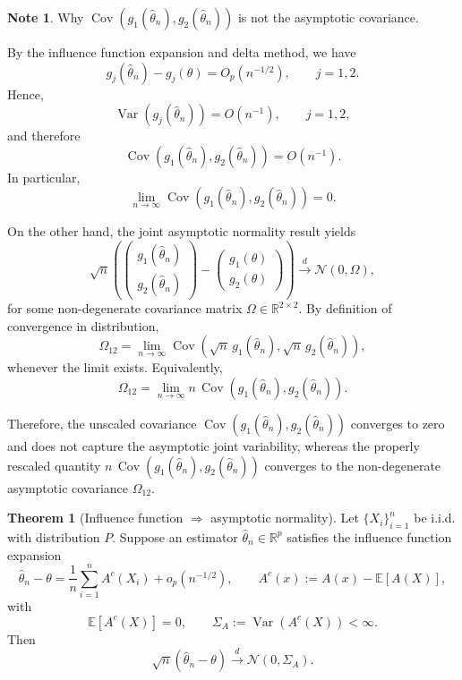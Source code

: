 \documentclass[11pt]{article}
\theoremstyle{definition}
\newtheorem{note}{Note}[section]
\newtheorem{theo}{Theorem}[section]
\begin{document}
\begin{note}
Why $\operatorname{Cov}(g_1(\hat\theta_n), g_2(\hat\theta_n))$ is not the asymptotic covariance.

By the influence function expansion and delta method, we have
\[
g_j(\hat\theta_n) - g_j(\theta)
=
O_p(n^{-1/2}),
\qquad j = 1,2.
\]
Hence,
\[
\operatorname{Var}\!\left(g_j(\hat\theta_n)\right)
=
O(n^{-1}),
\qquad j = 1,2,
\]
and therefore
\[
\operatorname{Cov}\!\left(g_1(\hat\theta_n), g_2(\hat\theta_n)\right)
=
O(n^{-1}).
\]
In particular,
\[
\lim_{n \to \infty}
\operatorname{Cov}\!\left(g_1(\hat\theta_n), g_2(\hat\theta_n)\right)
= 0.
\]

On the other hand, the joint asymptotic normality result yields
\[
\sqrt{n}
\left(
\begin{pmatrix}
g_1(\hat\theta_n) \\
g_2(\hat\theta_n)
\end{pmatrix}
-
\begin{pmatrix}
g_1(\theta) \\
g_2(\theta)
\end{pmatrix}
\right)
\xrightarrow{d}
\mathcal{N}(0, \Omega),
\]
for some non-degenerate covariance matrix $\Omega \in \mathbb{R}^{2 \times 2}$.
By definition of convergence in distribution,
\[
\Omega_{12}
=
\lim_{n \to \infty}
\operatorname{Cov}
\!\left(
\sqrt{n}\, g_1(\hat\theta_n),
\sqrt{n}\, g_2(\hat\theta_n)
\right),
\]
whenever the limit exists. Equivalently,
\[
\Omega_{12}
=
\lim_{n \to \infty}
n \, \operatorname{Cov}
\!\left(
g_1(\hat\theta_n),
g_2(\hat\theta_n)
\right).
\]

Therefore, the unscaled covariance $\operatorname{Cov}(g_1(\hat\theta_n), g_2(\hat\theta_n))$ converges to zero and does not capture the asymptotic joint variability, whereas the properly rescaled quantity $n \, \operatorname{Cov}(g_1(\hat\theta_n), g_2(\hat\theta_n))$ converges to the non-degenerate asymptotic covariance $\Omega_{12}$.
\end{note}

\begin{theo}[Influence function $\Rightarrow$ asymptotic normality]
\label{thm:if-clt}
Let $\{X_i\}_{i=1}^n$ be i.i.d. with distribution $P$.
Suppose an estimator $\hat\theta_n \in \mathbb{R}^p$ satisfies the influence function expansion
\[
\hat\theta_n - \theta
=
\frac{1}{n}\sum_{i=1}^n A^c(X_i) + o_p(n^{-1/2}),
\qquad
A^c(x) := A(x) - \mathbb{E}[A(X)],
\]
with
\[
\mathbb{E}[A^c(X)] = 0,
\qquad
\Sigma_A := \operatorname{Var}(A^c(X)) < \infty.
\]
Then
\[
\sqrt{n}(\hat\theta_n - \theta)
\xrightarrow{d}
\mathcal{N}(0, \Sigma_A).
\]
\end{theo}
\end{document}
